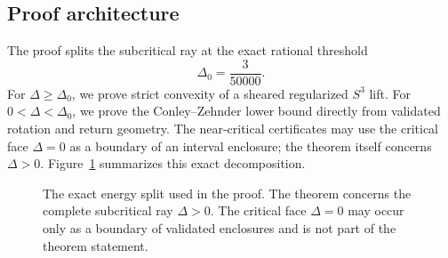 \documentclass[11pt]{article}
\begin{document}
\subsection{Proof architecture}
The proof splits the subcritical ray at the exact rational threshold
\[
\Delta_0=\frac{3}{50000}.
\]
For $\Delta\ge\Delta_0$, we prove strict convexity of a sheared regularized $S^3$ lift. For $0<\Delta<\Delta_0$, we prove the Conley--Zehnder lower bound directly from validated rotation and return geometry. The near-critical certificates may use the critical face $\Delta=0$ as a boundary of an interval enclosure; the theorem itself concerns $\Delta>0$. Figure~\ref{fig:energy-split} summarizes this exact decomposition.

\begin{figure}[ht]
\centering
{}
\caption{The exact energy split used in the proof. The theorem concerns the complete subcritical ray $\Delta>0$. The critical face $\Delta=0$ may occur only as a boundary of validated enclosures and is not part of the theorem statement.}
\label{fig:energy-split}
\end{figure}
\end{document}
